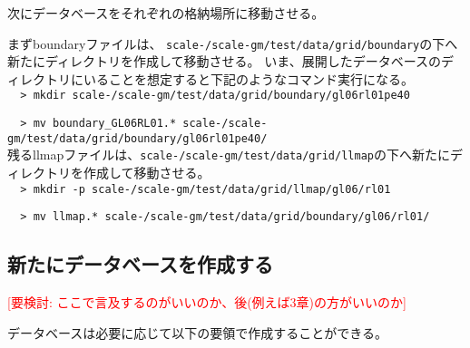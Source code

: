 \noindent 次にデータベースをそれぞれの格納場所に移動させる。

\noindent まずboundaryファイルは、
\texttt{scale-{\version}/scale-gm/test/data/grid/boundary}の下へ新たにディレクトリを作成して移動させる。
いま、展開したデータベースのディレクトリにいることを想定すると下記のようなコマンド実行になる。
\\

\verb|  > mkdir scale-|{\version}\verb|/scale-gm/test/data/grid/boundary/gl06rl01pe40|

\verb|  > mv boundary_GL06RL01.* scale-|{\version}\verb|/scale-gm/test/data/grid/boundary/gl06rl01pe40/|
\\

\noindent 残るllmapファイルは、\texttt{scale-{\version}/scale-gm/test/data/grid/llmap}の下へ新たにディレクトリを作成して移動させる。\\

\verb|  > mkdir -p scale-|{\version}\verb|/scale-gm/test/data/grid/llmap/gl06/rl01|

\verb|  > mv llmap.* scale-|{\version}\verb|/scale-gm/test/data/grid/boundary/gl06/rl01/| \\


\subsection{新たにデータベースを作成する}
\textcolor{red}{[要検討: ここで言及するのがいいのか、後(例えば3章)の方がいいのか]}

データベースは必要に応じて以下の要領で作成することができる。
